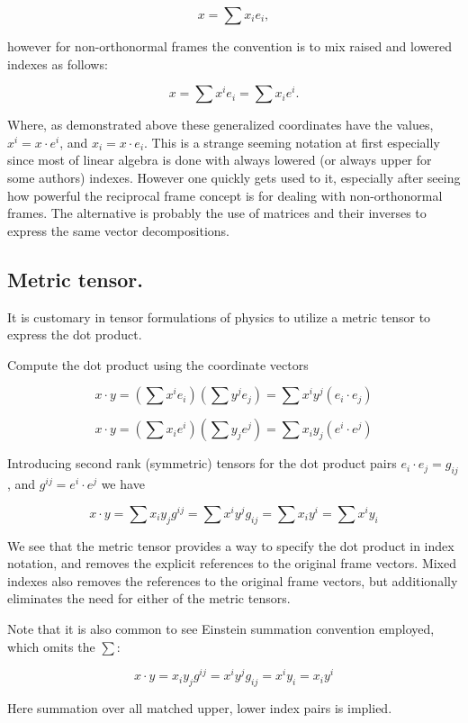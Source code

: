 \documentclass{article}      %
\begin{document}
\[
x = \sum x_i e_i,
\]

however for non-orthonormal frames the convention is to mix raised and lowered indexes as follows:

\[
x = \sum x^i e_i = \sum x_i e^i.
\]

Where, as demonstrated above these generalized coordinates have the values, $x^i = x \cdot e^i$, and $x_i = x \cdot e_i$.  This is a strange seeming notation at
first especially since most of linear algebra is done with always lowered (or always upper for some authors) indexes.  However one quickly gets used to it, especially after seeing how powerful the reciprocal frame concept is for dealing with non-orthonormal frames.  The alternative is probably the use of matrices and their inverses to express the same vector decompositions.

\subsection{ Metric tensor. }

It is customary in tensor formulations of physics to utilize a metric tensor to express the dot product.

Compute the dot product using the coordinate vectors

\[
x \cdot y = \left(\sum x^i e_i \right)\left(\sum y^j e_j \right) = \sum x^i y^j \left( e_i \cdot e_j \right)
\]

\[
x \cdot y = \left(\sum x_i e^i \right)\left(\sum y_j e^j \right) = \sum x_i y_j \left( e^i \cdot e^j \right)
\]

Introducing second rank (symmetric) tensors for the dot product pairs $ e_i \cdot e_j = g_{ij}$, and $ g^{ij} = e^i \cdot e^j $ we have

\[
x \cdot y = \sum x_i y_j g^{ij} = \sum x^i y^j g_{ij} = \sum x_i y^i = \sum x^i y_i
\]

We see that the metric tensor provides a way to specify the dot product in index notation, and removes the explicit references to the original frame vectors.  Mixed indexes also removes the references to the original frame vectors, but additionally eliminates the need for either of the metric tensors.

Note that it is also common to see Einstein summation convention employed, which omits the $\sum$:

\[
x \cdot y = x_i y_j g^{ij} = x^i y^j g_{ij} = x^i y_i = x_i y^i
\]

Here summation over all matched upper, lower index pairs is implied.
\end{document}
